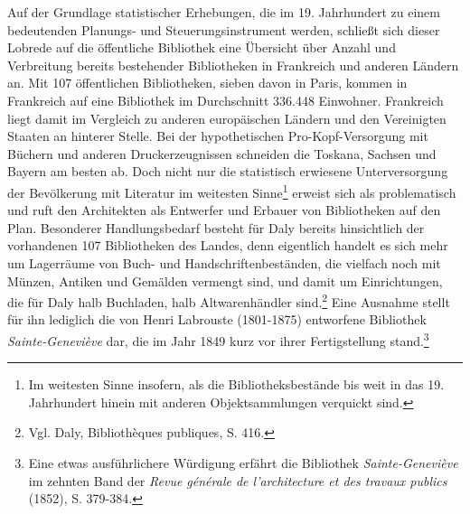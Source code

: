 Auf der Grundlage statistischer Erhebungen, die im 19. Jahrhundert zu
einem bedeutenden Planungs- und Steuerungsinstrument werden, schließt
sich dieser Lobrede auf die öffentliche Bibliothek eine Übersicht über
Anzahl und Verbreitung bereits bestehender Bibliotheken in Frankreich
und anderen Ländern an. Mit 107 öffentlichen Bibliotheken, sieben davon
in Paris, kommen in Frankreich auf eine Bibliothek im Durchschnitt
336.448 Einwohner. Frankreich liegt damit im Vergleich zu anderen
europäischen Ländern und den Vereinigten Staaten an hinterer Stelle. Bei
der hypothetischen Pro-Kopf-Versorgung mit Büchern und anderen
Druckerzeugnissen schneiden die Toskana, Sachsen und Bayern am besten
ab. Doch nicht nur die statistisch erwiesene Unterversorgung der
Bevölkerung mit Literatur im weitesten Sinne\footnote{Im weitesten Sinne
  insofern, als die Bibliotheksbestände bis weit in das 19. Jahrhundert
  hinein mit anderen Objektsammlungen verquickt sind.} erweist sich als
problematisch und ruft den Architekten als Entwerfer und Erbauer von
Bibliotheken auf den Plan. Besonderer Handlungsbedarf besteht für Daly
bereits hinsichtlich der vorhandenen 107 Bibliotheken des Landes, denn
eigentlich handelt es sich mehr um Lagerräume von Buch- und
Handschriftenbeständen, die vielfach noch mit Münzen, Antiken und
Gemälden vermengt sind, und damit um Einrichtungen, die für Daly halb
Buchladen, halb Altwarenhändler sind.\footnote{Vgl. Daly, Bibliothèques
  publiques, S. 416.} Eine Ausnahme stellt für ihn lediglich die von
Henri Labrouste (1801-1875) entworfene Bibliothek
\emph{Sainte-Geneviève} dar, die im Jahr 1849 kurz vor ihrer
Fertigstellung stand.\footnote{Eine etwas ausführlichere Würdigung
  erfährt die Bibliothek \emph{Sainte-Geneviève} im zehnten Band der
  \emph{Revue générale de l'architecture et des travaux publics} (1852),
  S. 379-384.}


